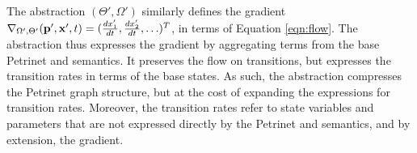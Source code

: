 The abstraction $(\Theta', \Omega')$ similarly defines the gradient $\nabla_{\Omega', \Theta'}({\bf p}', {\bf x}', t) = (\frac{dx_1'}{dt},
\frac{dx_2'}{dt}, \ldots)^T$, in terms of Equation \ref{eqn:flow}.
The abstraction thus expresses the gradient by aggregating terms from the
base Petrinet and semantics.  It preserves the flow on transitions, but
expresses the transition rates in terms of the base states.  As such, the
abstraction compresses the Petrinet graph structure, but at the cost of
expanding the expressions for transition rates. Moreover, the transition
rates refer to state variables and parameters that are not expressed
directly by the Petrinet and semantics, and by extension, the gradient. 

